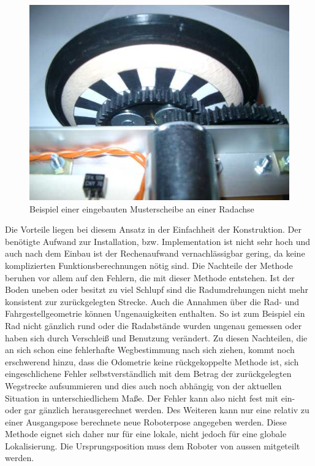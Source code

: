\begin{figure}[h]
\center
\includegraphics[scale=0.5]{graphics/odo_einbau.jpg}
\caption{\label{fig:Odo_Einbau} Beispiel einer eingebauten Musterscheibe an einer Radachse\citep{odom}}
\end{figure}

Die Vorteile liegen bei diesem Ansatz in der Einfachheit der Konstruktion. Der benötigte Aufwand zur Installation, bzw. Implementation ist nicht sehr hoch und auch nach dem Einbau ist der Rechenaufwand vernachlässigbar gering, da keine komplizierten Funktionsberechnungen nötig sind. Die Nachteile der Methode beruhen vor allem auf den Fehlern, die mit dieser Methode entstehen. Ist der Boden uneben oder besitzt zu viel Schlupf sind die Radumdrehungen nicht mehr konsistent zur zurückgelegten Strecke. Auch die Annahmen über die Rad- und Fahrgestellgeometrie können Ungenauigkeiten enthalten. So ist zum Beispiel ein Rad nicht gänzlich rund oder die Radabstände wurden ungenau gemessen oder haben sich durch Verschleiß und Benutzung verändert. Zu diesen Nachteilen, die an sich schon eine fehlerhafte Wegbestimmung nach sich ziehen, kommt noch erschwerend hinzu, dass die Odometrie keine rückgekoppelte Methode ist, sich eingeschlichene Fehler selbstverständlich mit dem Betrag der zurückgelegten Wegstrecke aufsummieren und dies auch noch abhängig von der aktuellen Situation in unterschiedlichem Maße. Der Fehler kann also nicht fest mit ein- oder gar gänzlich herausgerechnet werden. Des Weiteren kann nur eine relativ zu einer Ausgangspose berechnete neue Roboterpose angegeben werden. Diese Methode eignet sich daher nur für eine lokale, nicht jedoch für eine globale Lokalisierung. Die Ursprungsposition muss dem Roboter von aussen mitgeteilt werden.

